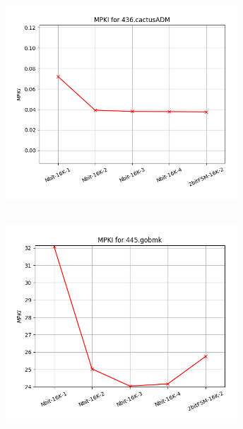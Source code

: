    \begin{minipage}{\textwidth}
      \begin{center}
         \\
         \vspace{3mm}
         \includegraphics[width=0.65\textwidth, frame]{./graphs/4-2i/436-cactusADM.png}
         \vspace{6mm}
      \end{center}
   \end{minipage}

   \begin{minipage}{\textwidth}
      \begin{center}
         \\
         \vspace{3mm}
         \includegraphics[width=0.65\textwidth, frame]{./graphs/4-2i/445-gobmk.png}
         \vspace{6mm}
      \end{center}
   \end{minipage}


